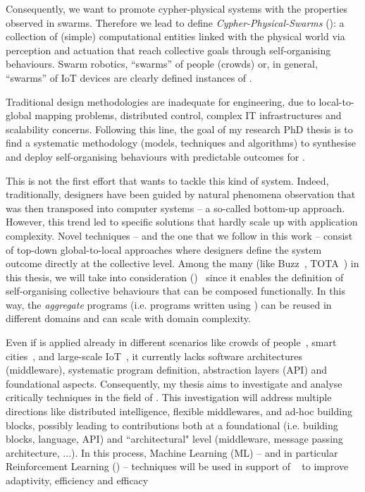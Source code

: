 \documentclass[11pt]{article}
\begin{document}
Consequently, we want to promote cypher-physical systems with the properties observed in swarms. 
%
Therefore we lead to define \textit{Cypher-Physical-Swarms} (\cpsw{}): a collection of (simple) computational entities linked with the physical world via perception and actuation that reach collective goals through self-organising behaviours.
%
Swarm robotics, ``swarms” of people (crowds) or, in general, ``swarms” of IoT devices are clearly defined instances of \cpsw{}.

Traditional design methodologies are inadequate for \cpsw{} engineering, due to local-to-global mapping problems, distributed control, complex IT infrastructures and scalability concerns.
%
Following this line, the goal of my research PhD thesis is to find a systematic methodology (models, techniques and algorithms) to synthesise and deploy self-organising behaviours with predictable outcomes for \cpsw{}.

This is not the first effort that wants to tackle this kind of system. Indeed, traditionally, designers have been guided by natural phenomena observation that was then transposed into computer systems -- a so-called
bottom-up approach. However, this trend led to specific solutions that hardly scale up with application complexity.
%
Novel techniques -- and the one that we follow in this work -- consist of top-down global-to-local approaches where designers define the system outcome directly at the collective level.
%
Among the many (like Buzz~\cite{DBLP:journals/software/PinciroliB16}, TOTA~\cite{DBLP:conf/icdcsw/MameiZL03}) in this thesis, we will take into consideration \textit{\acfull{}} (\ac{})~\cite{DBLP:journals/computer/BealPV15} since it enables the definition of self-organising collective behaviours that can be composed functionally. In this way, the \textit{aggregate} programs (i.e. programs written using \ac{}) can be reused in different domains and can scale with domain complexity. 

Even if \ac{} is applied already in different scenarios like crowds of people~\cite{DBLP:journals/computer/BealPV15}, smart cities~\cite{DBLP:journals/isci/CasadeiFPRSV19}, and large-scale IoT~\cite{DBLP:journals/fgcs/CasadeiFPRSV19}, it currently lacks software architectures (middleware), systematic program definition, abstraction layers (API) and foundational aspects.
%
Consequently, my thesis aims to investigate and analyse critically \acfull{} techniques in the field of \cpsw{}.
%
This investigation will address multiple directions like distributed intelligence, flexible middlewares, and ad-hoc building blocks, possibly leading to contributions both at a foundational (i.e. building blocks, \ac{} language, API) and ``architectural" level (middleware, message passing architecture, ...).
%
In this process, Machine Learning (ML) -- and in particular Reinforcement Learning (\rl{}) -- techniques will be used in support of \acfull{}~\cite{research} to improve adaptivity, efficiency and efficacy
\end{document}
